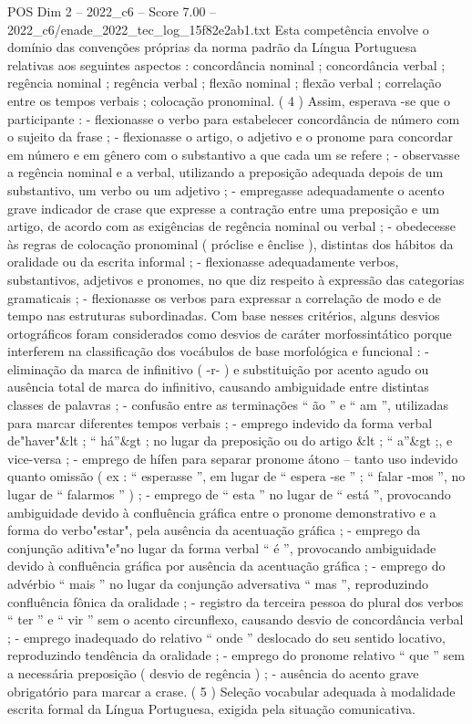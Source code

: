\begin{textsample}{POS Dim 2 – 2022\_c6 – Score 7.00 – 2022\_c6/enade\_2022\_tec\_log\_15f82e2ab1.txt}
Esta competência envolve o domínio das convenções próprias da norma padrão da Língua Portuguesa relativas aos seguintes aspectos : concordância nominal ; concordância verbal ; regência nominal ; regência verbal ; flexão nominal ; flexão verbal ; correlação entre os tempos verbais ; colocação pronominal. ( 4 ) Assim, esperava -se que o participante : - flexionasse o verbo para estabelecer concordância de número com o sujeito da frase ; - flexionasse o artigo, o adjetivo e o pronome para concordar em número e em gênero com o substantivo a que cada um se refere ; - observasse a regência nominal e a verbal, utilizando a preposição adequada depois de um substantivo, um verbo ou um adjetivo ; - empregasse adequadamente o acento grave indicador de crase que expresse a contração entre uma preposição e um artigo, de acordo com as exigências de regência nominal ou verbal ; - obedecesse às regras de colocação pronominal ( próclise e ênclise ), distintas dos hábitos da oralidade ou da escrita informal ; - flexionasse adequadamente verbos, substantivos, adjetivos e pronomes, no que diz respeito à expressão das categorias gramaticais ; - flexionasse os verbos para expressar a correlação de modo e de tempo nas estruturas subordinadas.
Com base nesses critérios, alguns desvios ortográficos foram considerados como desvios de caráter morfossintático porque interferem na classificação dos vocábulos de base morfológica e funcional : - eliminação da marca de infinitivo ( -r- ) e substituição por acento agudo ou ausência total de marca do infinitivo, causando ambiguidade entre distintas classes de palavras ; - confusão entre as terminações “ ão ” e “ am ”, utilizadas para marcar diferentes tempos verbais ; - emprego indevido da forma verbal de"haver"\&lt ; “ há”\&gt ; no lugar da preposição ou do artigo \&lt ; “ a”\&gt ;, e vice-versa ; - emprego de hífen para separar pronome átono – tanto uso indevido quanto omissão ( ex : “ esperasse ”, em lugar de “ espera -se ” ; “ falar -mos ”, no lugar de “ falarmos ” ) ; - emprego de “ esta ” no lugar de “ está ”, provocando ambiguidade devido à confluência gráfica entre o pronome demonstrativo e a forma do verbo"estar", pela ausência da acentuação gráfica ; - emprego da conjunção aditiva"e"no lugar da forma verbal “ é ”, provocando ambiguidade devido à confluência gráfica por ausência da acentuação gráfica ; - emprego do advérbio “ mais ” no lugar da conjunção adversativa “ mas ”, reproduzindo confluência fônica da oralidade ; - registro da terceira pessoa do plural dos verbos “ ter ” e “ vir ” sem o acento circunflexo, causando desvio de concordância verbal ; - emprego inadequado do relativo “ onde ” deslocado do seu sentido locativo, reproduzindo tendência da oralidade ; - emprego do pronome relativo “ que ” sem a necessária preposição ( desvio de regência ) ; - ausência do acento grave obrigatório para marcar a crase. ( 5 ) Seleção vocabular adequada à modalidade escrita formal da Língua Portuguesa, exigida pela situação comunicativa.

\end{textsample}
